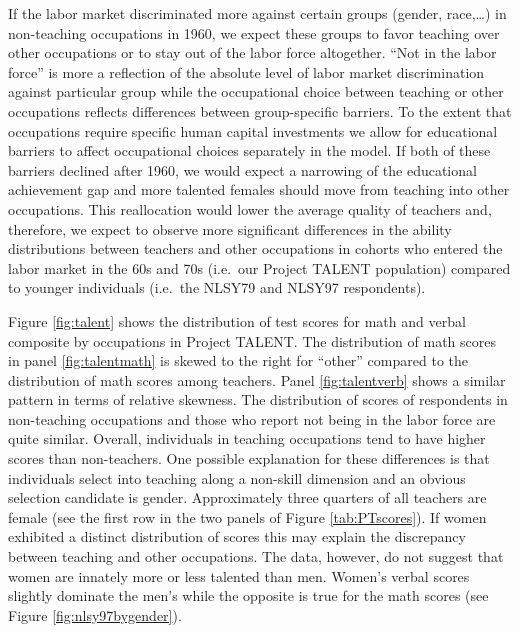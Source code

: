 \documentclass[onehalfspacing,11pt]{article}
\begin{document}
If the labor market discriminated more against certain groups (gender, race,\ldots) in non-teaching occupations in 1960, we expect these groups to favor teaching over other occupations or to stay out of the labor force altogether. ``Not in the labor force'' is more a reflection of the absolute level of labor market discrimination against particular group while the occupational choice between teaching or other occupations reflects differences between group-specific barriers. To the extent that occupations require specific human capital investments we allow for educational barriers to affect occupational choices separately in the model. If both of these barriers declined after 1960, we would expect a narrowing of the educational achievement gap and more talented females should move from teaching into other occupations. This reallocation would lower the average quality of teachers and, therefore, we expect to observe more significant differences in the ability distributions between teachers and other occupations in cohorts who entered the labor market in the 60s and 70s (i.e.~our Project TALENT population) compared to younger individuals (i.e.~the NLSY79 and NLSY97 respondents). 
	
Figure \ref{fig:talent} shows the distribution of test scores for math and verbal composite by occupations in Project TALENT. The distribution of math scores in panel \ref{fig:talentmath} is skewed to the right for ``other'' compared to the distribution of math scores among teachers. Panel \ref{fig:talentverb} shows a similar pattern in terms of relative skewness. The distribution of scores of respondents in non-teaching occupations and those who report not being in the labor force are quite similar. Overall, individuals in teaching occupations tend to have higher scores than non-teachers. One possible explanation for these differences is that individuals select into teaching along a non-skill dimension and an obvious selection candidate is gender. Approximately three quarters of all teachers are female (see the first row in the two panels of Figure \ref{tab:PTscores}). If women exhibited a distinct distribution of scores this may explain the discrepancy between teaching and other occupations. The data, however, do not suggest that women are innately more or less talented than men. Women's verbal scores slightly dominate the men's while the opposite is true for the math scores (see Figure \ref{fig:nlsy97bygender}).
\end{document}
